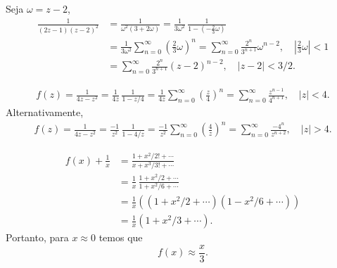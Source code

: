 \begin{questions}
\begin{solution}
    Seja $\omega = z-2$,
    \begin{align*}
        \frac{1}{(2z - 1)(z - 2)^2} &= \frac{1}{\omega^2(3+2\omega)}
                = \frac{1}{3\omega^2}\,\frac{1}{1-(-\tfrac{2}{3}\omega)} \\
            &= \frac{1}{3\omega^2} \sum_{n=0}^\infty \left(\frac{2}{3}\omega\right)^{n}
                = \sum_{n=0}^\infty \frac{2^{n}}{3^{n+1}}\omega^{n-2}, \quad |\tfrac{2}{3}\omega| < 1 \\
            &= \sum_{n=0}^\infty \frac{2^{n}}{3^{n+1}}(z-2)^{n-2},
                \quad |z-2| < 3/2.
    \end{align*}
\end{solution}

%
\begin{solution}
    \begin{align*}
        f(z) = \frac{1}{4z - z^2} = \frac{1}{4z}\,\frac{1}{1 - z/4}
            = \frac{1}{4z} \sum_{n=0}^\infty \left(\frac{z}{4}\right)^n
            = \sum_{n=0}^\infty \frac{z^{n-1}}{4^{n+1}}, \quad |z| < 4.
    \end{align*}
    Alternativamente,
    \begin{align*}
        f(z) = \frac{1}{4z - z^2} = \frac{-1}{z^2}\,\frac{1}{1 - 4/z}
            = \frac{-1}{z^2} \sum_{n=0}^\infty \left(\frac{4}{z}\right)^n
            = \sum_{n=0}^\infty \frac{-4^n}{z^{n+2}}, \quad |z| > 4.
    \end{align*}
\end{solution}

%
\begin{solution}
    \begin{align*}
        f(x) + \frac{1}{x} &= \frac{1+x^2/2!+\cdots}{x+x^3/3!+\cdots}\\
            &= \frac{1}{x}\,\frac{1+x^2/2+\cdots}{1+x^2/6+\cdots}\\
            &= \frac{1}{x} \left( (1+x^2/2 + \cdots) (1 - x^2/6 + \cdots) \right)\\
            &= \frac{1}{x} (1 + x^2/3 + \cdots).
    \end{align*}
    Portanto, para $x\approx 0$ temos que
    \[f(x) \approx \frac{x}{3}.\]


\end{solution}
\end{questions}
